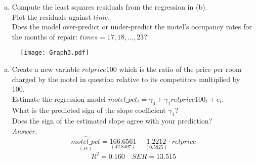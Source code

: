 \documentclass[11pt, xcolor=x11names,compress]{beamer}
\begin{document}
\begin{frame}[fragile,t]
\begin{enumerate}[(d)]
    \item Compute the least squares residuals from the regression in (b).\\
    Plot the residuals against $time$. 
    \\ Does the model over-predict or under-predict the motel’s occupancy rates for the months of repair: $times = 17,18,...,23$?
\end{enumerate}
\pause
\vspace{3mm}
\begin{figure}[h]
    \centering
    \texttt{[image: Graph3.pdf]}
    \caption{}
    \label{fig:my_label}
\end{figure}
\end{frame}

\begin{frame}[fragile,t]
\begin{enumerate}[(e)]
    \item Create a new variable $relprice100$ which is the ratio of the price per room charged by the motel in question relative to its competitors multiplied by 100.\\  Estimate the regression model $motel\_pct_t = \gamma_0 + \gamma_1 relprice100_t + e_t$. \\
    What is the predicted sign of the slope coefficient $\gamma_1$? \\
    Does the sign of the estimated slope agree with your prediction?\\
\pause
\vspace{10mm}
\textit{Answer.}
\begin{equation*}
    \underset{(se)}{\widehat{motel\_pct}} = \underset{(42.8497)}{166.6561} -  \underset{(0.5825)}{1.2212} \cdot relprice
\end{equation*}
\begin{equation*}
    R^2=0.160 \quad SER=13.515
\end{equation*}
\end{enumerate}
\end{frame}
\end{document}
